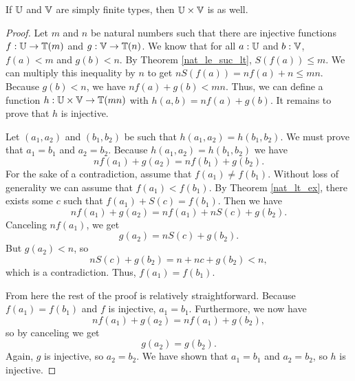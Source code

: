 \documentclass[../math.tex]{subfiles}
\begin{document}
\begin{theorem} \label{simple_finite_prod}
    If $\mathbb{U}$ and $\mathbb{V}$ are simply finite types, then $\mathbb{U} \times \mathbb{V}$ is as well.
\end{theorem}
\begin{proof}
    Let $m$ and $n$ be natural numbers such that there are injective functions
    $f : \mathbb{U} \to \mathbb{T}(m)$ and $g : \mathbb{V} \to \mathbb{T}(n)$.  We know that for all $a : \mathbb{U}$
    and $b : \mathbb{V}$, $f(a) < m$ and $g(b) < n$.  By Theorem \ref{nat_le_suc_lt},
    $S(f(a)) \leq m$.  We can multiply this inequality by $n$ to get $nS(f(a)) =
    nf(a) + n \leq mn$.  Because $g(b) < n$, we have $nf(a) + g(b) < mn$.  Thus,
    we can define a function $h : \mathbb{U} \times \mathbb{V} \to \mathbb{T}(mn)$ with $h(a, b) = nf(a)
    + g(b)$.  It remains to prove that $h$ is injective.

    Let $(a_1, a_2)$ and $(b_1, b_2)$ be such that $h(a_1, a_2) = h(b_1, b_2)$.
    We must prove that $a_1 = b_1$ and $a_2 = b_2$.  Because $h(a_1, a_2) =
    h(b_1, b_2)$ we have
    \[
        nf(a_1) + g(a_2) = nf(b_1) + g(b_2).
    \]
    For the sake of a contradiction, assume that $f(a_1) \neq f(b_1)$.  Without
    loss of generality we can assume that $f(a_1) < f(b_1)$.  By Theorem
    \ref{nat_lt_ex}, there exists some $c$ such that $f(a_1) + S(c) = f(b_1)$.
    Then we have
    \[
        nf(a_1) + g(a_2) = nf(a_1) + nS(c) + g(b_2).
    \]
    Canceling $nf(a_1)$, we get
    \[
        g(a_2) = nS(c) + g(b_2).
    \]
    But $g(a_2) < n$, so
    \[
        nS(c) + g(b_2) = n + nc + g(b_2) < n,
    \]
    which is a contradiction.  Thus, $f(a_1) = f(b_1)$.

    From here the rest of the proof is relatively straightforward.  Because
    $f(a_1) = f(b_1)$ and $f$ is injective, $a_1 = b_1$.  Furthermore, we now
    have
    \[
        nf(a_1) + g(a_2) = nf(a_1) + g(b_2),
    \]
    so by canceling we get
    \[
        g(a_2) = g(b_2).
    \]
    Again, $g$ is injective, so $a_2 = b_2$.  We have shown that $a_1 = b_1$ and
    $a_2 = b_2$, so $h$ is injective.
\end{proof}
\end{document}
